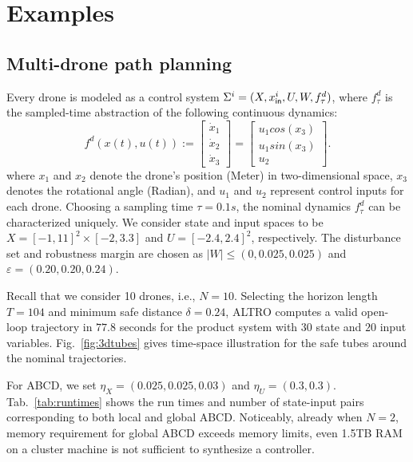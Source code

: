 \section{Examples}

\subsection{Multi-drone path planning}\label{sec:Multirobot}

Every drone is modeled as a control system $\Sigma^i=(X,x_{\mathsf{in}}^i,U,W,f^d_\tau)$, 
where $f^d_\tau$ is the sampled-time abstraction of the following continuous dynamics:
\begin{equation*}\label{eq:unicycle_ss}
	f^{d}(x(t),u(t)) :=
	\begin{bmatrix}
		\dot{x}_1\\
		\dot{x}_2\\
		\dot{x}_3
	\end{bmatrix}=
	\begin{bmatrix}
		u_1cos(x_3)\\
		u_1sin(x_3)\\
		u_2
	\end{bmatrix}.
\end{equation*}
where $x_1$ and $x_2$ denote the drone's position (Meter) in two-dimensional space, $x_3$ denotes the rotational angle (Radian), and $u_1$ and $u_2$ represent control inputs for each drone. Choosing a sampling time $\tau=0.1s$, the nominal dynamics $f^d_\tau$ can be characterized uniquely. 
We consider state and input spaces to be $X=[-1,11]^2\times[-2,3.3]$ and $U=[-2.4,2.4]^2$, respectively. 
The disturbance set and robustness margin are chosen as $|W|\leq (0,0.025,0.025)$ and $\varepsilon=(0.20,0.20,0.24)$.

Recall that we consider 10 drones, i.e., $N = 10$.
Selecting the horizon length $T=104$ and minimum safe distance $\delta=0.24$, ALTRO computes a valid open-loop trajectory 
in $77.8$ seconds for the product system with $30$ state and $20$ input variables.  
Fig.~\ref{fig:3dtubes} gives time-space illustration for the safe tubes around the nominal trajectories. 

For ABCD, we set  $\eta_{X}=(0.025,0.025,0.03)$ and $\eta_{U}=(0.3,0.3)$. 
Tab.~\ref{tab:runtimes} shows the run times and number of state-input pairs corresponding to both local and global ABCD. 
Noticeably, already when $N=2$, memory requirement for global ABCD exceeds memory limits, 
even 1.5TB RAM on a cluster machine is not sufficient to synthesize a controller.

